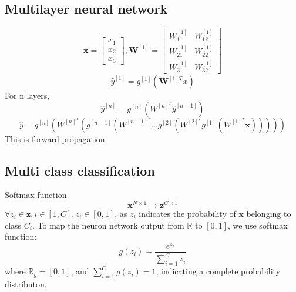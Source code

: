 \documentclass{article}
\begin{document}
\subsection*{Multilayer neural network}
\[\textbf{x} = \begin{bmatrix}
    x_1 \\ x_2\\x_3
    \end{bmatrix}, \textbf{W}^{[1]} = \begin{bmatrix}
        W^{[1]}_{11} & W^{[1]}_{12} \\ W^{[1]}_{21} & W^{[1]}_{22}\\ W^{[1]}_{31} & W^{[1]}_{32} 
        \end{bmatrix}\]
        \[\hat{y}^{[1]} = g^{[1]}(\textbf{W}^{[1]T}x)\]
For n layers, 
\[\hat{y}^{[n]} = g^{[n]}(W^{[n]^T}\hat{y}^{[n-1]})\]
\[\hat{y} = g^{[n]}(W^{[n]^T}(g^{[n-1]}(W^{[n-1]^T}... g^{[2]}(W^{[2]^T} g^{[1]}(W^{[1]^T}\textbf{x})))))\]
This is forward propagation


\subsection*{Multi class classification}
Softmax function
\[\textbf{x}^{N\times 1} \rightarrow \textbf{z}^{C \times 1}\]
$\forall z_i \in \textbf{z}, i \in [1, C], z_i \in [0, 1]$, as $z_i$ indicates the probability of $\textbf{x}$ belonging to class $C_i$. 
To map the neuron network output from $\mathbb{R}$ to $[0, 1]$, we use softmax function: 
\[g(z_i) = \frac{e^{z_i}}{\sum_{i=1}^{C} z_i}\]
where $\mathbb{R}_g = [0, 1]$, and $\sum_{i=1}^{C} g(z_i) = 1$, indicating a complete probability distributon.
\end{document}
